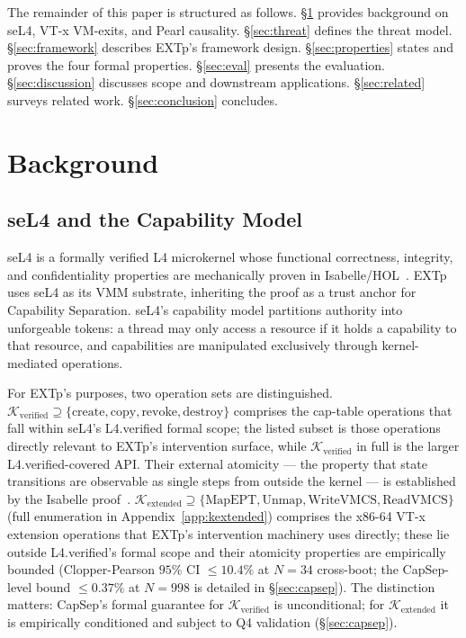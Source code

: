 \documentclass[conference]{IEEEtran}
\newcommand{\Kverified}{\mathcal{K}_\text{verified}}
\newcommand{\Kextended}{\mathcal{K}_\text{extended}}
\begin{document}
The remainder of this paper is structured as follows. \S\ref{sec:background}
provides background on seL4, VT-x VM-exits, and Pearl causality.
\S\ref{sec:threat} defines the threat model. \S\ref{sec:framework}
describes EXTp's framework design. \S\ref{sec:properties} states and
proves the four formal properties. \S\ref{sec:eval} presents the
evaluation. \S\ref{sec:discussion} discusses scope and downstream
applications. \S\ref{sec:related} surveys related work.
\S\ref{sec:conclusion} concludes.

\section{Background}\label{sec:background}

\subsection{seL4 and the Capability Model}

seL4 is a formally verified L4 microkernel whose functional
correctness, integrity, and confidentiality properties are
mechanically proven in
Isabelle/HOL~\cite{klein2009sel4,klein2014sel4}. EXTp uses seL4 as
its VMM substrate, inheriting the proof as a trust anchor for
Capability Separation. seL4's capability model partitions authority
into unforgeable tokens: a thread may only access a resource if it
holds a capability to that resource, and capabilities are manipulated
exclusively through kernel-mediated operations.

For EXTp's purposes, two operation sets are distinguished.
$\Kverified \supseteq \{\text{create}, \text{copy}, \text{revoke},
\text{destroy}\}$ comprises the cap-table operations that fall
within seL4's L4.verified formal scope; the listed subset is
those operations directly relevant to EXTp's intervention surface,
while $\Kverified$ in full is the larger L4.verified-covered
API. Their external atomicity --- the property that state
transitions are observable as single steps from outside the
kernel --- is established by the Isabelle
proof~\cite{klein2009sel4}. $\Kextended \supseteq \{\text{MapEPT},
\text{Unmap}, \text{WriteVMCS}, \text{ReadVMCS}\}$ (full enumeration
in Appendix~\ref{app:kextended}) comprises the x86-64 VT-x extension
operations that EXTp's intervention machinery uses directly; these
lie outside L4.verified's formal scope and their atomicity properties
are empirically bounded (Clopper-Pearson $95\%$ CI $\leq 10.4\%$ at
$N{=}34$ cross-boot; the CapSep-level bound $\leq 0.37\%$ at $N{=}998$
is detailed in \S\ref{sec:capsep}). The distinction matters: CapSep's
formal guarantee for $\Kverified$ is unconditional; for $\Kextended$
it is empirically conditioned and subject to Q4 validation
(\S\ref{sec:capsep}).
\end{document}
